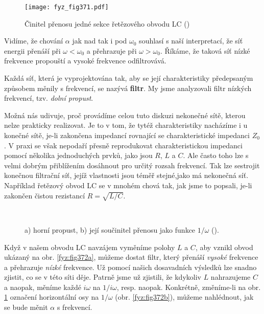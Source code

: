   \begin{figure}[ht!] %
    \centering
    \texttt{[image: fyz\_fig371.pdf]}
    \caption{Činitel přenosu jedné sekce řetězového obvodu LC
             (\cite[s.~411]{Feynman02})}
    \label{fyz:fig371}
  \end{figure}
  
  Vidíme, že chování \(\alpha\) jak nad tak i pod \(\omega_0\) souhlasí s naší interpretací, že síť 
  energii přenáší při \(\omega<\omega_0\) a přehrazuje při \(\omega>\omega_0\). Říkáme, že taková 
  síť nízké frekvence propouští a vysoké frekvence odfiltrovává.
  
  Každá síť, která je vyprojektována tak, aby se její charakteristiky předepsaným způsobem měnily s 
  frekvencí, se nazývá \textbf{filtr}. My jsme analyzovali filtr nízkých frekvencí, tzv. 
  \emph{dolní propust}.
  
  Možná nás udivuje, proč provádíme celou tuto diskuzi nekonečné sítě, kterou nelze prakticky 
  realizovat. Je to v tom, že tytéž charakteristiky nacházíme i u konečné sítě, je-li zakončena 
  impedancí rovnající se charakteristické impedanci \(Z_0\). V praxi se však nepodaří přesně 
  reprodukovat charakteristickou impedanci pomocí několika jednoduchých prvků, jako jsou \(R\), 
  \(L\) a \(C\). Ale často toho lze s velmi dobrým přiblížením dosáhnout pro určitý rozsah 
  frekvencí. Tak lze sestrojit konečnou filtrační síť, jejíž vlastnosti jsou téměř stejné,jako má 
  nekonečná síť. Například řetězový obvod LC se v mnohém chová tak, jak jsme to popsali, je-li 
  zakončen čistou rezistancí \(R = \sqrt{L/C}\).
    
  \begin{figure}[ht!] %
    \centering
     \\
    \caption{a) horní propust, b) její součinitel přenosu jako funkce \(1/\omega\)
             (\cite[s.~411]{Feynman02}).}
    \label{fyz:fig372}
  \end{figure}
  
  Když v našem obvodu LC navzájem vyměníme polohy \(L\) a \(C\), aby vznikl obvod ukázaný na obr. 
  \ref{fyz:fig372a}, můžeme dostat filtr, který přenáší \emph{vysoké} frekvence a přehrazuje 
  \emph{nízké} frekvence. Už pomocí našich dosavadních výsledků lze snadno zjistit, co se v této 
  síti děje. Patrně jsme už zjistili, že kdykoliv \(L\) nahrazujeme \(C\) a naopak, měníme každé 
  \(i\omega\) na \(1/i\omega\), resp. naopak. Konkrétně, změníme-li na obr. \ref{fyz:fig371} 
  označení horizontální osy na \(1/\omega\) (obr. \ref{fyz:fig372b}), můžeme nahlédnout, jak se 
  bude měnit \(\alpha\) s frekvencí. 
  
